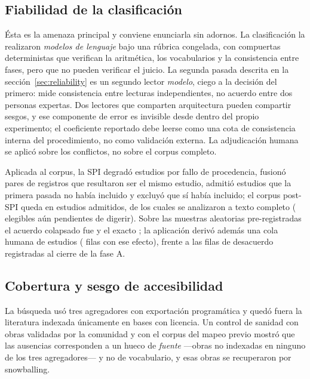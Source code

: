 \documentclass[conference]{IEEEtran}
\begin{document}
\subsection{Fiabilidad de la clasificación}

Ésta es la amenaza principal y conviene enunciarla sin adornos. La clasificación la realizaron
\emph{modelos de lenguaje} bajo una rúbrica congelada, con compuertas deterministas que verifican la
aritmética, los vocabularios y la consistencia entre fases, pero que no pueden verificar el juicio.
La segunda pasada descrita en la sección~\ref{sec:reliability} es un segundo lector \emph{modelo},
ciego a la decisión del primero: mide consistencia entre lecturas independientes, no acuerdo entre
dos personas expertas. Dos lectores que comparten arquitectura pueden compartir sesgos, y ese
componente de error es invisible desde dentro del propio experimento; el coeficiente reportado debe
leerse como una cota de consistencia interna del procedimiento, no como validación externa. La
adjudicación humana se aplicó sobre los conflictos, no sobre el corpus completo.

Aplicada al corpus, la SPI degradó \clPostDegradados{} estudios por fallo de procedencia, fusionó
\clPostFusiones{} pares de registros que resultaron ser el mismo estudio, admitió \clPostAdmitidosSpi{}
estudios que la primera pasada no había incluido y excluyó \clPostExcluidosSpi{} que sí había incluido;
el corpus post-SPI queda en \clPostCorpus{} estudios admitidos, de los cuales \clPostDigest{} se
analizaron a texto completo (\clPostPendientesDigest{} elegibles aún pendientes de digerir). Sobre las
muestras aleatorias pre-registradas el acuerdo colapsado fue \clFiaKappaColapsado{} y el exacto
\clFiaKappaExacto{}; la aplicación derivó además una cola humana de \clFiaColaHumana{} estudios
(\clFiaColaHumanaFilas{} filas con ese efecto), frente a las \clFiaConflictosFilas{} filas de desacuerdo
registradas al cierre de la fase A.

\subsection{Cobertura y sesgo de accesibilidad}

La búsqueda usó tres agregadores con exportación programática y quedó fuera la literatura indexada
únicamente en bases con licencia. Un control de sanidad con obras validadas por la comunidad y con
el corpus del mapeo previo mostró que las ausencias corresponden a un hueco de \emph{fuente} —obras
no indexadas en ninguno de los tres agregadores— y no de vocabulario, y esas obras se recuperaron por
snowballing.
\end{document}
